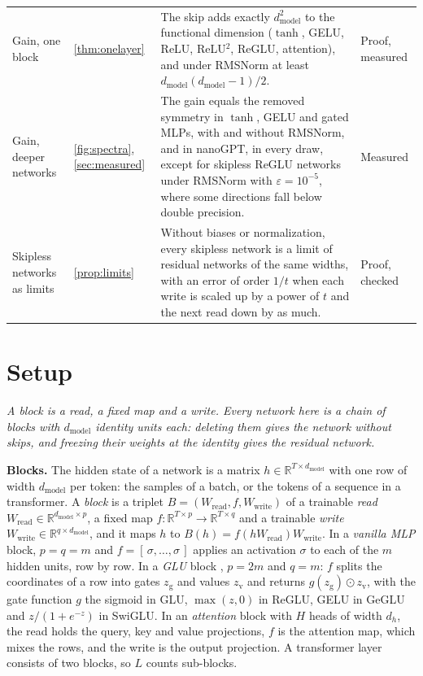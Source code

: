 \documentclass[10pt]{article}
\theoremstyle{definition}
\theoremstyle{remark}
\newcommand{\R}{\mathbb{R}}
\newcommand{\Wread}{W_{\mathrm{read}}}
\newcommand{\Wwrite}{W_{\mathrm{write}}}
\newcommand{\dm}{d_{\mathrm{model}}}
\newcommand{\para}[1]{\smallskip\noindent\textbf{#1}\hspace{0.5em}}
\newcommand{\takeaway}[1]{\noindent\textit{#1}\par\smallskip}
\begin{document}
\begin{table}[t]
\begin{tabular}{@{}L{0.17\textwidth}L{0.16\textwidth}L{0.52\textwidth}L{0.1\textwidth}@{}}
\addlinespace[1pt]
Gain, one block & \cref{thm:onelayer} & The skip adds exactly $\dm^2$ to the functional dimension ($\tanh$, GELU, ReLU, ReLU$^2$, ReGLU, attention), and under RMSNorm at least $\dm(\dm-1)/2$. & Proof, measured \\
\addlinespace[1pt]
Gain, deeper networks & \cref{fig:spectra}, \cref{sec:measured} & The gain equals the removed symmetry in $\tanh$, GELU and gated MLPs, with and without RMSNorm, and in nanoGPT, in every draw, except for skipless ReGLU networks under RMSNorm with $\varepsilon = 10^{-5}$, where some directions fall below double precision. & Measured \\
\addlinespace[1pt]
Skipless networks as limits & \cref{prop:limits} & Without biases or normalization, every skipless network is a limit of residual networks of the same widths, with an error of order $1/t$ when each write is scaled up by a power of $t$ and the next read down by as much. & Proof, checked \\
\bottomrule
\end{tabular}
\end{table}

\section{Setup}\label{sec:setup}

\takeaway{A block is a read, a fixed map and a write. Every network here is a chain of blocks with $\dm$ identity units each: deleting them gives the network without skips, and freezing their weights at the identity gives the residual network.}

\para{Blocks.} The hidden state of a network is a matrix $h \in \R^{T\times \dm}$ with one row of width $\dm$ per token: the samples of a batch, or the tokens of a sequence in a transformer. A \emph{block} is a triplet $B = (\Wread, f, \Wwrite)$ of a trainable \emph{read} $\Wread \in \R^{\dm\times p}$, a fixed map $f : \R^{T\times p} \to \R^{T\times q}$ and a trainable \emph{write} $\Wwrite \in \R^{q\times \dm}$, and it maps $h$ to $B(h) = f(h\Wread)\Wwrite$. In a \emph{vanilla MLP} block, $p = q = m$ and $f = [\,\sigma, \dots, \sigma\,]$ applies an activation $\sigma$ to each of the $m$ hidden units, row by row. In a \emph{GLU} block \citep{shazeer2020glu}, $p = 2m$ and $q = m$: $f$ splits the coordinates of a row into gates $z_{\mathrm g}$ and values $z_{\mathrm v}$ and returns $g(z_{\mathrm g}) \odot z_{\mathrm v}$, with the gate function $g$ the sigmoid in GLU, $\max(z, 0)$ in ReGLU, GELU in GeGLU and $z/(1 + e^{-z})$ in SwiGLU. In an \emph{attention} block with $H$ heads of width $d_h$, the read holds the query, key and value projections, $f$ is the attention map, which mixes the rows, and the write is the output projection. A transformer layer consists of two blocks, so $L$ counts sub-blocks.
\end{document}
